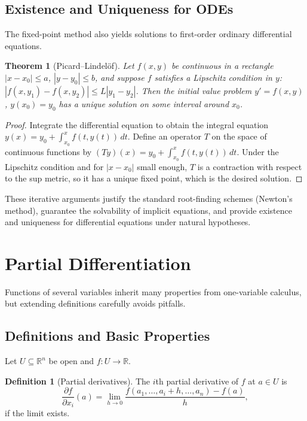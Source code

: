\documentclass{article}
\theoremstyle{definition}
\newtheorem{definition}{Definition}[section]
\theoremstyle{plain}
\newtheorem{theorem}{Theorem}[section]
\begin{document}
\subsection{Existence and Uniqueness for ODEs}\label{subsec:ode-existence}
The fixed-point method also yields solutions to first-order ordinary differential equations.
\begin{theorem}[Picard–Lindelöf]
	Let $f(x,y)$ be continuous in a rectangle $|x-x_0|\le a$, $|y-y_0|\le b$, and suppose $f$ satisfies a Lipschitz condition in $y$: $|f(x,y_1)-f(x,y_2)|\le L|y_1-y_2|$. Then the initial value problem $y' = f(x,y)$, $y(x_0)=y_0$ has a unique solution on some interval around $x_0$.
\end{theorem}
\begin{proof}
	Integrate the differential equation to obtain the integral equation $y(x)=y_0 + \int_{x_0}^x f(t,y(t))\,dt$. Define an operator $T$ on the space of continuous functions by $(Ty)(x)=y_0 + \int_{x_0}^x f(t,y(t))\,dt$. Under the Lipschitz condition and for $|x-x_0|$ small enough, $T$ is a contraction with respect to the sup metric, so it has a unique fixed point, which is the desired solution.
\end{proof}

These iterative arguments justify the standard root-finding schemes (Newton’s method), guarantee the solvability of implicit equations, and provide existence and uniqueness for differential equations under natural hypotheses.
		
		
\section{Partial Differentiation}\label{sec:partial-differentiation}
Functions of several variables inherit many properties from one-variable calculus, but extending definitions carefully avoids pitfalls.

\subsection{Definitions and Basic Properties}\label{subsec:partial-definitions}
Let $U\subseteq \mathbb{R}^n$ be open and $f\colon U\to \mathbb{R}$.
\begin{definition}[Partial derivatives]
	The $i$th partial derivative of $f$ at $a\in U$ is
	\[
		\frac{\partial f}{\partial x_i}(a) = \lim_{h\to 0} \frac{f(a_1,\dots,a_i+h,\dots,a_n) - f(a)}{h},
	\]
	if the limit exists.
\end{definition}
\end{document}
